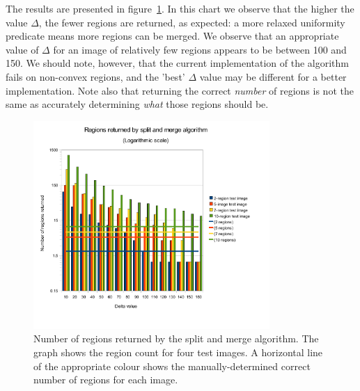 The results are presented in figure~\ref{fig:region-counts}. In this chart we observe that the higher the value $\Delta$, the fewer regions are returned, as expected: a more relaxed uniformity predicate means more regions can be merged. We observe that an appropriate value of $\Delta$ for an image of relatively few regions appears to be between 100 and 150. We should note, however, that the current implementation of the algorithm fails on non-convex regions, and the 'best' $\Delta$ value may be different for a better implementation. Note also that returning the correct \emph{number} of regions is not the same as accurately determining \emph{what} those regions should be.

\begin{figure}[h]
  \centering
  \includegraphics[width=0.8\textwidth]{figures/region-counts}
  \caption[Regions returned by split and merge algorithm]{Number of regions returned by the split and merge algorithm. The graph shows the region count for four test images. A horizontal line of the appropriate colour shows the manually-determined correct number of regions for each image.}
  \label{fig:region-counts}
\end{figure}
